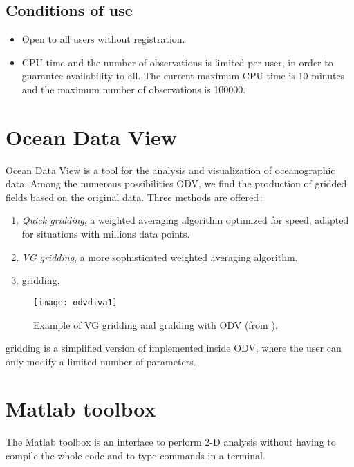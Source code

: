 \subsection{Conditions of use}


\begin{itemize}
\item Open to all users without registration.
\item CPU time and the number of observations is limited per user, in order to guarantee availability to all. The current maximum CPU time is 10 minutes and the maximum number of observations is 100000.
\end{itemize}


\section{Ocean Data View}

Ocean Data View \citep[ODV,][]{SCHLITZER02} is a tool for the analysis and visualization of oceanographic data. Among the numerous possibilities ODV, we find the production of gridded fields based on the original data. Three methods are offered \citep{SCHLITZER12}: 
\begin{enumerate}
\item \textit{Quick gridding}, a weighted averaging algorithm optimized for speed, adapted for situations with millions data points.
\item \textit{VG gridding}, a more sophisticated weighted averaging algorithm.
\item \diva gridding.
\end{enumerate}

\begin{figure}[H]
\centering 
\texttt{[image: odvdiva1]}
\caption{Example of VG gridding and \diva gridding with ODV (from \citet{SCHLITZER12}).\label{fig:divaodv}}
\end{figure}

\diva gridding is a simplified version of \diva implemented inside ODV, where the user can only modify a limited number of parameters.

\section{Matlab toolbox}

The \diva Matlab toolbox is an interface to perform 2-D analysis without having to compile the whole code and to type commands in a terminal. 

